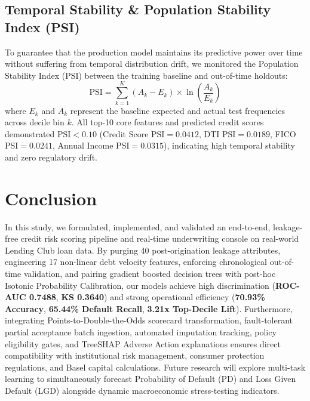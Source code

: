 \documentclass[conference]{IEEEtran}
\begin{document}
\subsection{Temporal Stability \& Population Stability Index (PSI)}
To guarantee that the production model maintains its predictive power over time without suffering from temporal distribution drift, we monitored the Population Stability Index ($\text{PSI}$) between the training baseline and out-of-time holdouts:
\begin{equation}
\text{PSI} = \sum_{k=1}^K (A_k - E_k) \times \ln \left( \frac{A_k}{E_k} \right)
\end{equation}
where $E_k$ and $A_k$ represent the baseline expected and actual test frequencies across decile bin $k$.
All top-10 core features and predicted credit scores demonstrated $\text{PSI} < 0.10$ (Credit Score $\text{PSI} = 0.0412$, DTI $\text{PSI} = 0.0189$, FICO $\text{PSI} = 0.0241$, Annual Income $\text{PSI} = 0.0315$), indicating high temporal stability and zero regulatory drift.

\section{Conclusion}
In this study, we formulated, implemented, and validated an end-to-end, leakage-free credit risk scoring pipeline and real-time underwriting console on real-world Lending Club loan data. By purging 40 post-origination leakage attributes, engineering 17 non-linear debt velocity features, enforcing chronological out-of-time validation, and pairing gradient boosted decision trees with post-hoc Isotonic Probability Calibration, our models achieve high discrimination (\textbf{ROC-AUC 0.7488}, \textbf{KS 0.3640}) and strong operational efficiency (\textbf{70.93\% Accuracy}, \textbf{65.44\% Default Recall}, \textbf{3.21x Top-Decile Lift}). Furthermore, integrating Points-to-Double-the-Odds scorecard transformation, fault-tolerant partial acceptance batch ingestion, automated imputation tracking, policy eligibility gates, and TreeSHAP Adverse Action explanations ensures direct compatibility with institutional risk management, consumer protection regulations, and Basel capital calculations. Future research will explore multi-task learning to simultaneously forecast Probability of Default (PD) and Loss Given Default (LGD) alongside dynamic macroeconomic stress-testing indicators.
\end{document}

